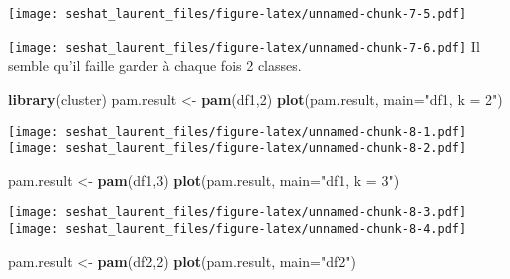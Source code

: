 \documentclass[
]{article}
\newenvironment{Shaded}{\begin{snugshade}}{\end{snugshade}}
\newcommand{\DataTypeTok}[1]{\textcolor[rgb]{0.13,0.29,0.53}{#1}}
\newcommand{\DecValTok}[1]{\textcolor[rgb]{0.00,0.00,0.81}{#1}}
\newcommand{\KeywordTok}[1]{\textcolor[rgb]{0.13,0.29,0.53}{\textbf{#1}}}
\newcommand{\NormalTok}[1]{#1}
\newcommand{\OperatorTok}[1]{\textcolor[rgb]{0.81,0.36,0.00}{\textbf{#1}}}
\newcommand{\StringTok}[1]{\textcolor[rgb]{0.31,0.60,0.02}{#1}}
\begin{document}
\texttt{[image: seshat\_laurent\_files/figure-latex/unnamed-chunk-7-5.pdf]}

\begin{Shaded}
\end{Shaded}

\texttt{[image: seshat\_laurent\_files/figure-latex/unnamed-chunk-7-6.pdf]}
Il semble qu'il faille garder à chaque fois 2 classes.

\begin{Shaded}
\begin{Highlighting}[]
\KeywordTok{library}\NormalTok{(cluster)}
\NormalTok{pam.result <-}\StringTok{ }\KeywordTok{pam}\NormalTok{(df1,}\DecValTok{2}\NormalTok{)}
\KeywordTok{plot}\NormalTok{(pam.result, }\DataTypeTok{main=}\StringTok{"df1, k = 2"}\NormalTok{)}
\end{Highlighting}
\end{Shaded}

\texttt{[image: seshat\_laurent\_files/figure-latex/unnamed-chunk-8-1.pdf]}
\texttt{[image: seshat\_laurent\_files/figure-latex/unnamed-chunk-8-2.pdf]}

\begin{Shaded}
\begin{Highlighting}[]
\NormalTok{pam.result <-}\StringTok{ }\KeywordTok{pam}\NormalTok{(df1,}\DecValTok{3}\NormalTok{)}
\KeywordTok{plot}\NormalTok{(pam.result, }\DataTypeTok{main=}\StringTok{"df1, k = 3"}\NormalTok{)}
\end{Highlighting}
\end{Shaded}

\texttt{[image: seshat\_laurent\_files/figure-latex/unnamed-chunk-8-3.pdf]}
\texttt{[image: seshat\_laurent\_files/figure-latex/unnamed-chunk-8-4.pdf]}

\begin{Shaded}
\begin{Highlighting}[]
\NormalTok{pam.result <-}\StringTok{ }\KeywordTok{pam}\NormalTok{(df2,}\DecValTok{2}\NormalTok{)}
\KeywordTok{plot}\NormalTok{(pam.result, }\DataTypeTok{main=}\StringTok{"df2"}\NormalTok{)}
\end{Highlighting}
\end{Shaded}
\end{document}

